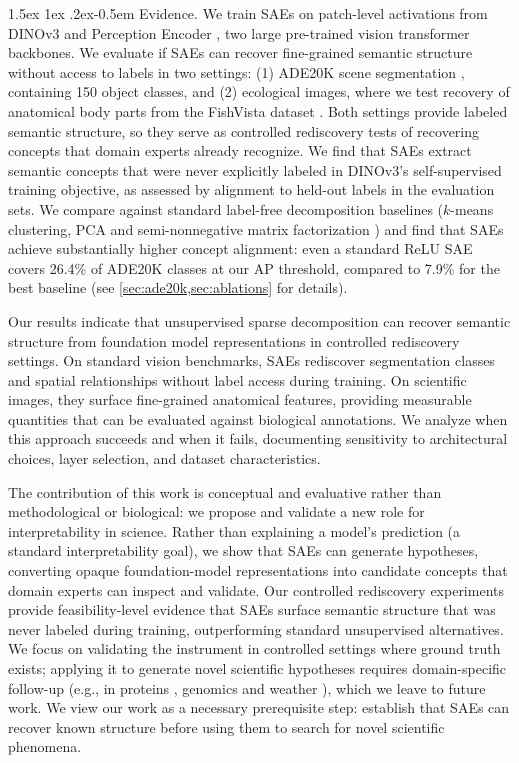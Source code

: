 \documentclass[runningheads]{llncs}
\makeatletter
\renewcommand{\paragraph}{%
  \@startsection{paragraph}{4}%
  {\z@}{1.5ex \@plus 1ex \@minus .2ex}{-0.5em}%
  {\normalfont\normalsize\bfseries}%
}
\makeatother
\begin{document}
\paragraph{Evidence.}
We train SAEs on patch-level activations from DINOv3 \citep{simeoni2025dinov3} and Perception Encoder \citep{bolya2025perception}, two large pre-trained vision transformer \citep[ViT;][]{dosovitskiy2020vit} backbones.
We evaluate if SAEs can recover fine-grained semantic structure without access to labels in two settings: (1) ADE20K scene segmentation \citep{zhou2017ade20k}, containing \num{150} object classes, and (2) ecological images, where we test recovery of anatomical body parts from the FishVista dataset \citep{mehrab2024fishvista,fishvistadataset}.
Both settings provide labeled semantic structure, so they serve as controlled rediscovery tests of recovering concepts that domain experts already recognize.
We find that SAEs extract semantic concepts that were never explicitly labeled in DINOv3's self-supervised training objective, as assessed by alignment to held-out labels in the evaluation sets.
We compare against standard label-free decomposition baselines ($k$-means clustering, PCA and semi-nonnegative matrix factorization \citep[SemiNMF;][]{ding2008convex}) and find that SAEs achieve substantially higher concept alignment: even a standard ReLU SAE covers \num{26.4}\% of ADE20K classes at our AP threshold, compared to \num{7.9}\% for the best baseline (see \cref{sec:ade20k,sec:ablations} for details).

Our results indicate that unsupervised sparse decomposition can recover semantic structure from foundation model representations in controlled rediscovery settings.
On standard vision benchmarks, SAEs rediscover segmentation classes and spatial relationships without label access during training.
On scientific images, they surface fine-grained anatomical features, providing measurable quantities that can be evaluated against biological annotations.
We analyze when this approach succeeds and when it fails, documenting sensitivity to architectural choices, layer selection, and dataset characteristics.

The contribution of this work is conceptual and evaluative rather than methodological or biological: we propose and validate a new role for interpretability in science. 
Rather than explaining a model's prediction (a standard interpretability goal), we show that SAEs can generate hypotheses, converting opaque foundation-model representations into candidate concepts that domain experts can inspect and validate. 
Our controlled rediscovery experiments provide feasibility-level evidence that SAEs surface semantic structure that was never labeled during training, outperforming standard unsupervised alternatives. 
We focus on validating the instrument in controlled settings where ground truth exists; applying it to generate novel scientific hypotheses requires domain-specific follow-up (e.g., in proteins \citep{abramson2024alphafold3}, genomics \citep{cui2024scgpt} and weather \citep{lam2023graphcast}), which we leave to future work.
We view our work as a necessary prerequisite step: establish that SAEs can recover known structure before using them to search for novel scientific phenomena.
\end{document}
